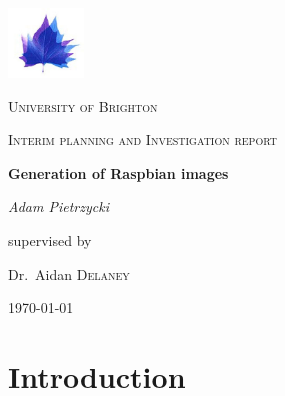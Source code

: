 \documentclass[12pt,a4paper]{report}
\begin{document}
\begin{titlepage}
	\centering
	\includegraphics[width=0.15\textwidth]{Brighton-University-logo.png}\par
	{\scshape\LARGE University of Brighton\par}
	\vspace{1cm}
	{\scshape\Large Interim planning and Investigation report\par}
	\vspace{1.5cm}
	{\huge\bfseries Generation of Raspbian images\par}
	\vspace{2cm}
	{\Large\itshape Adam Pietrzycki\par}
	\vfill
	supervised by\par
	Dr.~Aidan \textsc{Delaney}
	\vfill
	{\large \today\par}
\end{titlepage}

\begin{abstract}
As of the 8th September 2016, in a blog post by raspberry pi founder Eben Upton\citep{blog}, mentions that the ten millionth raspberry pi has just been sold. The official operating system for these devices is called Rasbpian, it is a port of Debian which is available as a standalone image or in a 'New Out Of the Box Software' package for beginners. 'NOOBS' is pre-installed on SD cards that can be bought from many retailers, before the images can be burned to the cards they need to be somehow generated. The current method of generating these images can be found on GitHub\citep{pi-gen}, it is a set of shell scripts which from the commits look to be predominantly maintained by a single developer. The problem with this is that if the developer decided to move on and depart from the project it might take some time before someone else understands the code well enough to be able to carry it on; this can be simply described as the 'Bus Factor.'\citep{bus} Since the release of the raspberry pi in February 2012, new tools have been developed and standards decided; so it might be a nice idea to freshen up the current method.      
\end{abstract}

\pagebreak
\tableofcontents
\pagebreak

\chapter{Introduction}
\end{document}
